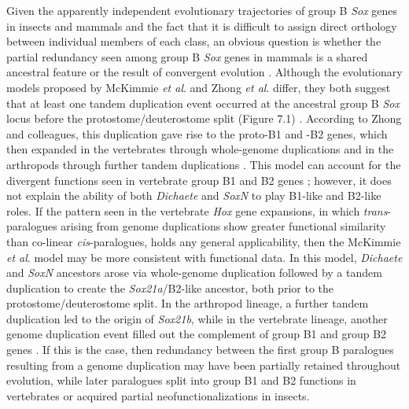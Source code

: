 Given the apparently independent evolutionary trajectories of group B \emph{Sox} genes in insects and mammals and the fact that it is difficult to assign direct orthology between individual members of each class, an obvious question is whether the partial redundancy seen among group B \emph{Sox} genes in mammals is a shared ancestral feature or the result of convergent evolution \citep{bergsland_sequentially_2011,ferri_sox2_2004,nishiguchi_sox1_1998,okuda_b1_2010,rizzoti_sox3_2004}. Although the evolutionary models proposed by McKimmie \emph{et al}. and Zhong \emph{et al}. differ, they both suggest that at least one tandem duplication event occurred at the ancestral group B \emph{Sox} locus before the protostome/deuterostome split (Figure 7.1) \citep{mckimmie_conserved_2005, zhong_parallel_2011}. According to Zhong and colleagues, this duplication gave rise to the proto-B1 and -B2 genes, which then expanded in the vertebrates through whole-genome duplications and in the arthropods through further tandem duplications \citep{zhong_parallel_2011}. This model can account for the divergent functions seen in vertebrate group B1 and B2 genes \citep{uchikawa_two_1999}; however, it does not explain the ability of both \emph{Dichaete} and \emph{SoxN} to play B1-like and B2-like roles. If the pattern seen in the vertebrate \emph{Hox} gene expansions, in which \emph{trans}-paralogues arising from genome duplications show greater functional similarity than co-linear \emph{cis}-paralogues, holds any general applicability, then the McKimmie \emph{et al}. model may be more consistent with functional data. In this model, \emph{Dichaete} and \emph{SoxN} ancestors arose via whole-genome duplication followed by a tandem duplication to create the \emph{Sox21a}/B2-like ancestor, both prior to the protostome/deuterostome split. In the arthropod lineage, a further tandem duplication led to the origin of \emph{Sox21b}, while in the vertebrate lineage, another genome duplication event filled out the complement of group B1 and group B2 genes \citep{mckimmie_conserved_2005}. If this is the case, then redundancy between the first group B paralogues resulting from a genome duplication may have been partially retained throughout evolution, while later paralogues split into group B1 and B2 functions in vertebrates or acquired partial neofunctionalizations in insects.

